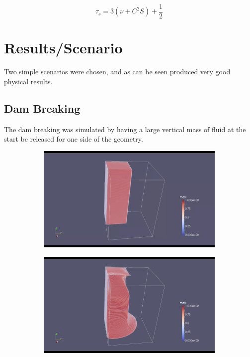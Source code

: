 \documentclass[10pt,a4paper,notitlepage]{article}
\begin{document}
\begin{equation} \label{eq:relax}
\tau_s=3(\nu+C^{2}S)+\frac{1}{2}
\end{equation}
\section{Results/Scenario}
Two simple scenarios were chosen, and as can be seen produced very good physical results.
\subsection{Dam Breaking}
The dam breaking was simulated by having a large vertical mass of fluid at the start be released for one side of the geometry.
\begin{figure}[H]
\centering
\begin{subfigure}{0.25\textwidth}
  \includegraphics[width=1.0\linewidth]{dam/1.png}
\end{subfigure}%
\begin{subfigure}{0.25\textwidth}
  \includegraphics[width=1.0\linewidth]{dam/2.png}
\end{subfigure}

\end{figure}
\end{document}
